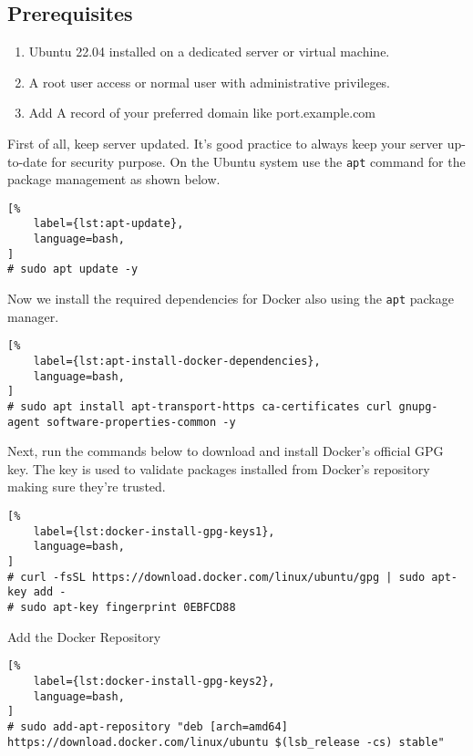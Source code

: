 \documentclass[%
	a4paper,
	oneside,
	listof=numbered,
	parskip=half,
	headsepline=true,
	footsepline=false,
	0.7headlines,
	]{scrbook}
\begin{document}
\subsection{Prerequisites}\label{subsec:prerequisites}

\begin{enumerate}
\item Ubuntu 22.04 installed on a dedicated server or virtual machine.
\item A root user access or normal user with administrative privileges.
\item Add A record of your preferred domain like port.example.com
\end{enumerate}

First of all, keep server updated.
It's good practice to always keep your server up-to-date for security purpose.
On the Ubuntu system use the \verb|apt| command for the package management as shown below.

\begin{lstlisting}[%
	label={lst:apt-update},
	language=bash,
]
# sudo apt update -y
\end{lstlisting}

Now we install the required dependencies for Docker also using the \verb|apt| package manager.

\begin{lstlisting}[%
	label={lst:apt-install-docker-dependencies},
	language=bash,
]
# sudo apt install apt-transport-https ca-certificates curl gnupg-agent software-properties-common -y
\end{lstlisting}


Next, run the commands below to download and install Docker’s official GPG key.
The key is used to validate packages installed from Docker’s repository making sure they’re trusted.

\begin{lstlisting}[%
	label={lst:docker-install-gpg-keys1},
	language=bash,
]
# curl -fsSL https://download.docker.com/linux/ubuntu/gpg | sudo apt-key add -
# sudo apt-key fingerprint 0EBFCD88
\end{lstlisting}

Add the Docker Repository

\begin{lstlisting}[%
	label={lst:docker-install-gpg-keys2},
	language=bash,
]
# sudo add-apt-repository "deb [arch=amd64] https://download.docker.com/linux/ubuntu $(lsb_release -cs) stable"
\end{lstlisting}
\end{document}
